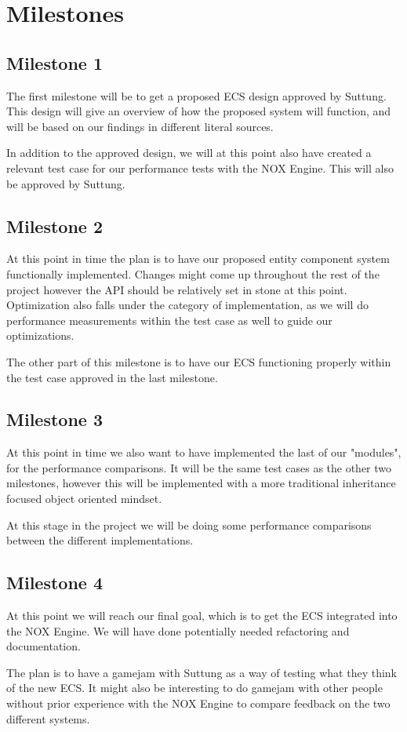 \section*{Milestones}
\subsection*{Milestone 1}
The first milestone will be to get a proposed ECS design approved by Suttung.
This design will give an overview of how the proposed system will function,
and will be based on our findings in different literal sources.

In addition to the approved design, we will at this point also have created a
relevant test case for our performance tests with the NOX Engine. 
This will also be approved by Suttung.

\subsection*{Milestone 2}
At this point in time the plan is to have our proposed entity component system
functionally implemented. Changes might come up throughout the rest of the project
however the API should be relatively set in stone at this point.
Optimization also falls under the category of implementation, as we will do 
performance measurements within the test case as well to guide our optimizations.

The other part of this milestone is to have our ECS functioning properly within
the test case approved in the last milestone. 

\subsection*{Milestone 3}
At this point in time we also want to have implemented the last of our "modules",
for the performance comparisons. It will be the same test cases as the other two
milestones, however this will be implemented with a more traditional inheritance focused
object oriented mindset.

At this stage in the project we will be doing some performance comparisons between
the different implementations.

\subsection*{Milestone 4}
At this point we will reach our final goal, which is to get the ECS integrated into the NOX Engine.
We will have done potentially needed refactoring and documentation.

The plan is to have a gamejam with Suttung as a way of testing what they think of the new ECS.
It might also be interesting to do gamejam with other people without prior experience with the NOX Engine
to compare feedback on the two different systems.